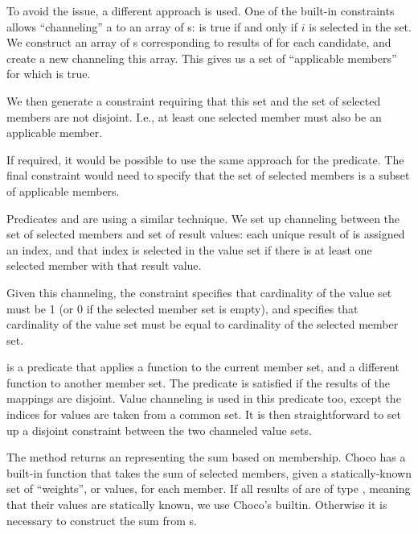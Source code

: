 To avoid the issue, a different approach is used. One of the built-in constraints allows
``channeling'' a  to an array of s:  is true if and
only if $i$ is selected in the set. We construct an array of s corresponding
to results of  for each candidate, and create a new  channeling this
array. This gives us a set of ``applicable members'' for which  is true.

We then generate a constraint requiring that this set and the set of selected members
are not disjoint. I.e., at least one selected member must also be an applicable member.

If required, it would be possible to use the same approach for the  predicate.
The final constraint would need to specify that the set of selected members is a subset
of applicable members.

\medskip

Predicates  and  are using a
similar technique. We set up channeling between the set of selected members and set of
result values: each unique result of  is assigned an index, and that index is
selected in the value set if there is at least one selected member with that result
value.

Given this channeling, the  constraint specifies that cardinality of the
value set must be 1 (or 0 if the selected member set is empty), and 
specifies that cardinality of the value set must be equal to cardinality of the selected
member set.

 is a predicate that applies a function to the current member set,
and a different function to another member set. The predicate is satisfied if the
results of the mappings are disjoint. Value channeling is used in this predicate too,
except the indices for values are taken from a common set. It is then straightforward to
set up a disjoint constraint between the two channeled value sets.

\medskip

The method  returns an  representing the
sum based on membership. Choco has a built-in function that takes the sum of selected
members, given a statically-known set of ``weights'', or values, for each member. If all
results of  are of type , meaning that their values are
statically known, we use Choco's builtin. Otherwise it is necessary to construct the sum
from s.

